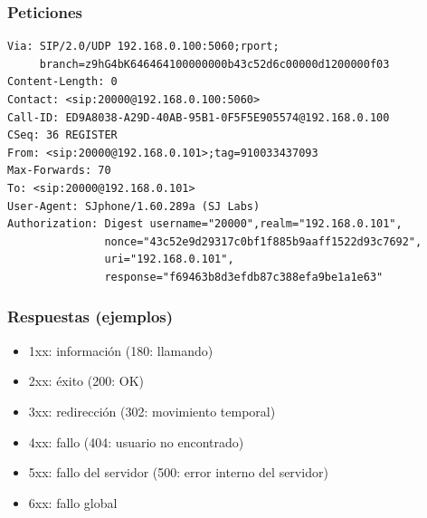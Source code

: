 \documentclass{beamer}
\begin{document}
\begin{frame}[fragile]
\frametitle{Peticiones}

\begin{footnotesize}
\begin{verbatim}
Via: SIP/2.0/UDP 192.168.0.100:5060;rport;
     branch=z9hG4bK646464100000000b43c52d6c00000d1200000f03
Content-Length: 0
Contact: <sip:20000@192.168.0.100:5060>
Call-ID: ED9A8038-A29D-40AB-95B1-0F5F5E905574@192.168.0.100
CSeq: 36 REGISTER
From: <sip:20000@192.168.0.101>;tag=910033437093
Max-Forwards: 70
To: <sip:20000@192.168.0.101>
User-Agent: SJphone/1.60.289a (SJ Labs)
Authorization: Digest username="20000",realm="192.168.0.101",
               nonce="43c52e9d29317c0bf1f885b9aaff1522d93c7692",
               uri="192.168.0.101",
               response="f69463b8d3efdb87c388efa9be1a1e63"
\end{verbatim}
\end{footnotesize}

\end{frame}



\begin{frame}
\frametitle{Respuestas (ejemplos)}

\begin{itemize}
\item 1xx: información (180: llamando)
\item 2xx: éxito (200: OK)
\item 3xx: redirección (302: movimiento temporal)
\item 4xx: fallo (404: usuario no encontrado)
\item 5xx: fallo del servidor (500: error interno del servidor)
\item 6xx: fallo global
\end{itemize}

\end{frame}


\end{document}
